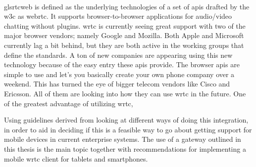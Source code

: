 \\gls{rtcweb} is defined as the underlying technologies of a set of \gls{api}s drafted by the \gls{w3c} as \gls{webrtc}. It supports browser-to-browser applications for audio/video chatting without plugins. \gls{wrtc} is currently seeing great support with two of the major browser vendors; namely Google and Mozilla. Both Apple and Microsoft currently lag a bit behind, but they are both active in the working groups that define the standards. A ton of new companies are appearing using this new technology because of the easy entry these \gls{api}s provide. The browser \gls{api}s are simple to use and let's you basically create your own phone company over a weekend. This has turned the eye of bigger telecom vendors like Cisco and Ericsson. All of them are looking into how they can use \gls{wrtc} in the future. One of the greatest advantage of utilizing \gls{wrtc},%

Using guidelines derived from looking at different ways of doing this integration, in order to aid in deciding if this is a feasible way to go about getting support for mobile devices in current enterprise systems. The use of a gateway outlined in this thesis is the main topic together with recommendations for implementing a mobile \gls{wrtc} client for tablets and smartphones.
